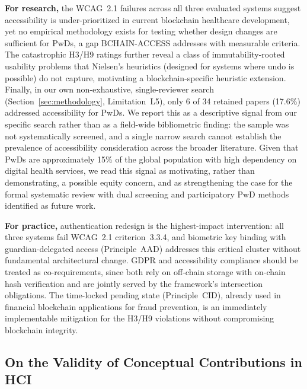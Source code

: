 \documentclass[journal,onecolumn]{IEEEtran}
\begin{document}
\textbf{For research,} the WCAG~2.1 failures across all three evaluated systems suggest accessibility is under-prioritized in current blockchain healthcare development, yet no empirical methodology exists for testing whether design changes are sufficient for PwDs, a gap BCHAIN-ACCESS addresses with measurable criteria. The catastrophic H3/H9 ratings further reveal a class of immutability-rooted usability problems that Nielsen's heuristics (designed for systems where undo is possible) do not capture, motivating a blockchain-specific heuristic extension. Finally, in our own non-exhaustive, single-reviewer search (Section~\ref{sec:methodology}, Limitation~L5), only 6 of 34 retained papers (17.6\%) addressed accessibility for PwDs. We report this as a descriptive signal from our specific search rather than as a field-wide bibliometric finding: the sample was not systematically screened, and a single narrow search cannot establish the prevalence of accessibility consideration across the broader literature. Given that PwDs are approximately 15\% of the global population \cite{who2023disability} with high dependency on digital health services, we read this signal as motivating, rather than demonstrating, a possible equity concern, and as strengthening the case for the formal systematic review with dual screening and participatory PwD methods identified as future work.

\textbf{For practice,} authentication redesign is the highest-impact intervention: all three systems fail WCAG~2.1 criterion~3.3.4, and biometric key binding with guardian-delegated access (Principle~AAD) addresses this critical cluster without fundamental architectural change. GDPR and accessibility compliance should be treated as co-requirements, since both rely on off-chain storage with on-chain hash verification and are jointly served by the framework's intersection obligations. The time-locked pending state (Principle~CID), already used in financial blockchain applications for fraud prevention, is an immediately implementable mitigation for the H3/H9 violations without compromising blockchain integrity.

\subsection{On the Validity of Conceptual Contributions in HCI}
\end{document}

